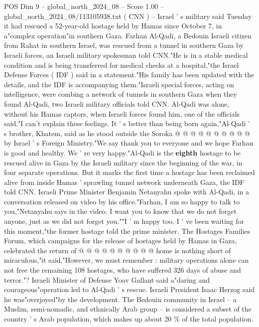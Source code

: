 \begin{textsample}{POS Dim 9 – global\_north\_2024\_08 – Score 1.00 – global\_north\_2024\_08/113105938.txt}  \label{ex:f9_pos_197}
( CNN ) -- Israel ' s military said Tuesday it had rescued a 52-year-old hostage held by Hamas since October 7, in a"complex operation"in southern Gaza.
Farhan Al-Qadi, a Bedouin Israeli citizen from Rahat in southern Israel, was rescued from a tunnel in southern Gaza by Israeli forces, an Israeli military spokesman told CNN."He is in a stable medical condition and is being transferred for medical checks at a hospital,"the Israel Defense Forces ( IDF ) said in a statement."His family has been updated with the details, and the IDF is accompanying them."Israeli special forces, acting on intelligence, were combing a network of tunnels in southern Gaza when they found Al-Qadi, two Israeli military officials told CNN.
Al-Qadi was alone, without his Hamas captors, when Israeli forces found him, one of the officials said."I can't explain these feelings.
It ' s better than being born again,"Al-Qadi ' s brother, Khatem, said as he stood outside the Soroka @ @ @ @ @ @ @ @ @ @ by Israel ' s Foreign Ministry."We say thank you to everyone and we hope Farhan is good and healthy.
We ' re very happy."Al-Qadi is the \textbf{eighth} hostage to be rescued alive in Gaza by the Israeli military since the beginning of the war, in four separate operations.
But it marks the first time a hostage has been reclaimed alive from inside Hamas ' sprawling tunnel network underneath Gaza, the IDF told CNN.
Israeli Prime Minister Benjamin Netanyahu spoke with Al-Qadi, in a conversation released on video by his office."Farhan, I am so happy to talk to you,"Netanyahu says in the video.
I want you to know that we do not forget anyone, just as we did not forget you.""I ' m happy too.
I ' ve been waiting for this moment,"the former hostage told the prime minister.
The Hostages Families Forum, which campaigns for the release of hostages held by Hamas in Gaza, celebrated the return of @ @ @ @ @ @ @ @ @ @ home is nothing short of miraculous,"it said."However, we must remember : military operations alone can not free the remaining 108 hostages, who have suffered 326 days of abuse and terror."?
Israeli Minister of Defense Yoav Gallant said a"daring and courageous"operation led to Al-Qadi ' s rescue.
Israeli President Isaac Herzog said he was"overjoyed"by the development.
The Bedouin community in Israel -- a Muslim, semi-nomadic, and ethnically Arab group -- is considered a subset of the country ' s Arab population, which makes up about 20 \% of the total population.

\end{textsample}
